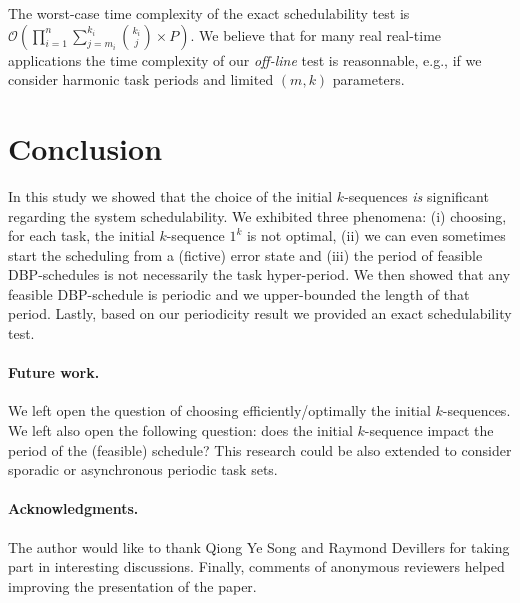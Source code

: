 \documentclass{article}
\newcommand{\bigOh}{\mathcal{O}}
\begin{document}
The worst-case time complexity of the exact schedulability test is $\bigOh(\prod_{i=1}^{n} \sum_{j=m_{i}}^{k_{i}}{k_{i}\choose j}\times P)$. We believe that for many real real-time applications the time complexity of our \emph{off-line} test is reasonnable, e.g., if we consider harmonic task periods and limited $(m,k)$ parameters.

\section{Conclusion}\label{sec:conclusion}
In this study we showed that the choice of the initial $k$-sequences \emph{is} significant regarding the system schedulability. We exhibited three phenomena: (i) choosing, for each task, the initial $k$-sequence $1^k$ is not optimal, (ii) we can even sometimes start the scheduling from a (fictive) error state and (iii) the period of feasible DBP-schedules is not necessarily the task hyper-period. We then showed that any feasible DBP-schedule is periodic and we upper-bounded the length of that period. Lastly, based on our periodicity result we provided an exact schedulability test. 

\paragraph{Future work.} We left open the question of choosing efficiently/optimally the initial $k$-sequences. We left also open the following question: does the initial $k$-sequence impact the period of the (feasible) schedule? This research could be also extended to consider sporadic or asynchronous periodic task sets.

\paragraph{Acknowledgments.} The author would like to thank \mbox{Qiong} Ye \mbox{Song} and \mbox{Raymond} \mbox{Devillers} for taking part in interesting discussions. Finally, comments of anonymous reviewers helped improving the presentation of the paper.



\end{document}

